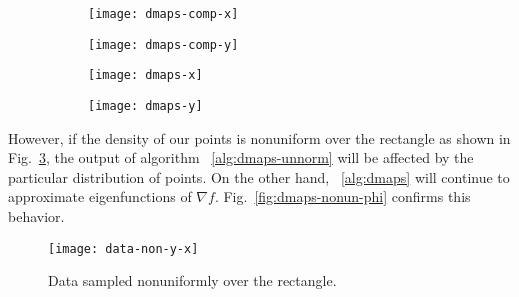 \begin{figure}
  \centering
  \begin{subfigure}[t]{0.45\linewidth}
    \centering
    \texttt{[image: dmaps-comp-x]}
  \end{subfigure}
  \begin{subfigure}[t]{0.45\linewidth}
    \centering
    \texttt{[image: dmaps-comp-y]}
  \end{subfigure}
  \caption[Illustration of DMAPS' parameterization of
  rectangle]{ \label{fig:dmaps-comp} }
\end{figure}

\begin{figure}
  \centering
  \begin{subfigure}[t]{0.45\linewidth}
    \centering
    \texttt{[image: dmaps-x]}
  \end{subfigure}
  \begin{subfigure}[t]{0.45\linewidth}
    \centering
    \texttt{[image: dmaps-y]}
  \end{subfigure}
  \caption[Comparison of analytical and numerical DMAPS results]{ \label{fig:dmaps-xy} }
\end{figure}

However, if the density of our points is nonuniform over the rectangle
as shown in Fig.~\ref{fig:dmaps-nonun-data}, the output of algorithm
~\ref{alg:dmaps-unnorm} will be affected by the particular
distribution of points. On the other hand, ~\ref{alg:dmaps} will
continue to approximate eigenfunctions of $\nabla
f$. Fig.~\ref{fig:dmaps-nonun-phi} confirms this behavior.

\begin{figure}
    \centering
    \texttt{[image: data-non-y-x]}
    \caption[Data with nonuniform density]{Data sampled nonuniformly over the
      rectangle. \label{fig:dmaps-nonun-data} }
\end{figure}


